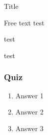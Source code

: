 \documentclass[11pt]{beamer}
\begin{document}
\begin{frame}{Title}



	\begin{block}{Free text}
		test
	\end{block}

  \begin{example}[asdf]
		test
	\end{example}

	\begin{theorem}[asdf]
		test
	\end{theorem}

\end{frame}


\begin{frame}
	\frametitle{Quiz}

	\begin{enumerate}
		\item Answer 1
		\item Answer 2
		\item Answer 3 \onslide<2->{\cmark}
	\end{enumerate}

\end{frame}
\end{document}

